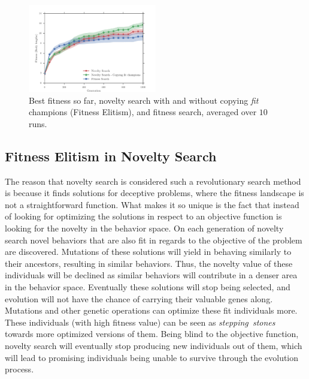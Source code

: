 \documentclass{sig-alternate}
\begin{document}
\begin{figure}[h!]
\centering
\includegraphics[width=0.5\textwidth]{../Figures/Results/CopyFitChampions10.pdf}
\caption{Best fitness so far, novelty search with and without copying \emph{fit} champions (Fitness Elitism), and fitness search, averaged over $10$ runs.}
\label{fig:CopyFitChampions10}
\end{figure}

\subsection{Fitness Elitism in Novelty Search}

The reason that novelty search is considered such a revolutionary search method is because it finds solutions for deceptive problems, where the fitness landscape is not a straightforward function. What makes it so unique is the fact that instead of looking for optimizing the solutions in respect to an objective function is looking for the novelty in the behavior space. On each generation of novelty search novel behaviors that are also fit in regards to the objective of the problem are discovered. Mutations of these solutions will yield in behaving similarly to their ancestors, resulting in similar behaviors. Thus, the novelty value of these individuals will be declined as similar behaviors will contribute in a denser area in the behavior space. Eventually these solutions will stop being selected, and evolution will not have the chance of carrying their valuable genes along. Mutations and other genetic operations can optimize these fit individuals more. These individuals (with high fitness value) can be seen as \emph{stepping~stones}~\cite{lehman2011abandoning} towards more optimized versions of them. Being blind to the objective function, novelty search will eventually stop producing new individuals out of them, which will lead to promising individuals being unable to survive through the evolution process. 
\end{document}
